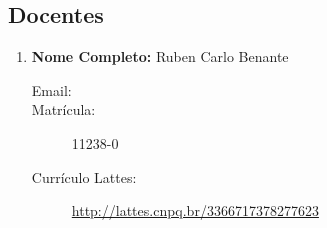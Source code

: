 \documentclass[a4paper,12pt]{article} %
\begin{document}
\begin{enumerate}
\end{enumerate}


\subsection*{Docentes}

\begin{enumerate}
    \item \textbf{Nome Completo:} Ruben Carlo Benante
    \begin{description}
        \item [Email:] 
        \item [Matrícula:] 11238-0
        \item [Currículo Lattes:] \url{http://lattes.cnpq.br/3366717378277623}
    \end{description}
\end{enumerate}



\nocite{*}


\end{document}
